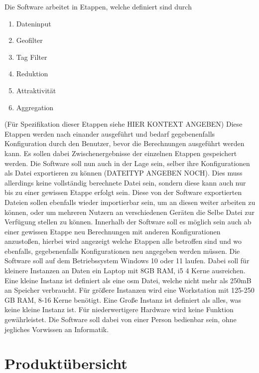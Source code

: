 \documentclass[parskip=full]{scrartcl} %
\begin{document}
\newpage
Die Software arbeitet in Etappen, welche definiert sind durch
\begin{enumerate}
    \item Dateninput
    \item Geofilter
    \item Tag Filter
    \item Reduktion
    \item Attraktivität
    \item Aggregation
\end{enumerate}

(Für Spezifikation dieser Etappen siehe HIER KONTEXT ANGEBEN)
\newline
Diese Etappen werden nach einander ausgeführt und bedarf gegebenenfalls Konfiguration durch den Benutzer, bevor die Berechnungen ausgeführt werden kann.
Es sollen dabei Zwischenergebnisse der einzelnen Etappen gespeichert werden.
Die Software soll nun auch in der Lage sein, selber ihre Konfigurationen als Datei exportieren zu können (DATEITYP ANGEBEN NOCH). Dies muss allerdings keine vollständig berechnete Datei sein, sondern diese kann auch nur bis zu einer gewissen Etappe erfolgt sein.
Diese von der Software exportierten Dateien sollen ebenfalls wieder importierbar sein, um an diesen weiter arbeiten zu können, oder um mehreren Nutzern an verschiedenen Geräten die Selbe Datei zur Verfügung stellen zu können.
Innerhalb der Software soll es möglich sein auch ab einer gewissen Etappe neu Berechnungen mit anderen Konfigurationen anzustoßen, hierbei wird angezeigt welche Etappen alle betroffen sind und wo ebenfalls, gegebenenfalls Konfigurationen neu angegeben werden müssen.
Die Software soll auf dem Betriebssystem Windows 10 oder 11 laufen.
Dabei soll für kleinere Instanzen an Daten ein Laptop mit 8GB RAM, i5 4 Kerne ausreichen.
Eine kleine Instanz ist definiert als eine osm Datei, welche nicht mehr als 250mB an Speicher verbraucht.
Für größere Instanzen wird eine Workstation mit 125-250 GB RAM, 8-16 Kerne benötigt.
Eine Große Instanz ist definiert als alles, was keine kleine Instanz ist.
Für niederwertigere Hardware wird keine Funktion gewährleistet.
Die Software soll dabei von einer Person bedienbar sein, ohne jegliches Vorwissen an Informatik.

\newpage







\section{Produktübersicht}
\newpage
\end{document}
